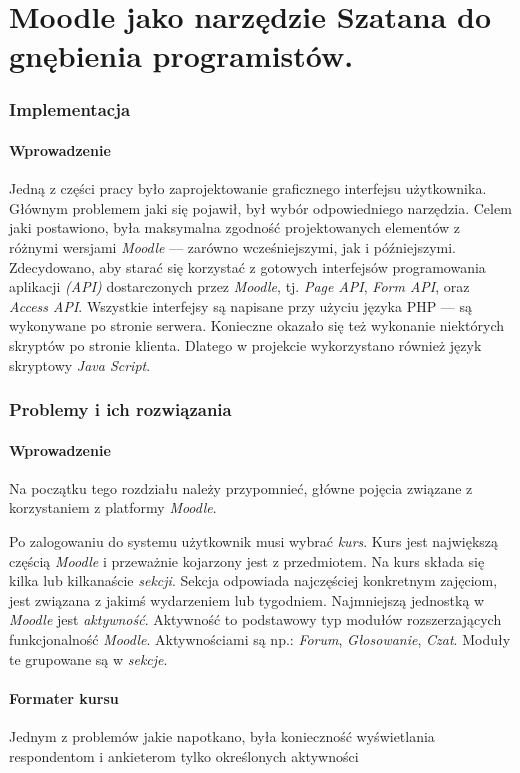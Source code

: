 \documentclass[12pt]{article}
\begin{document}
\part{Moodle jako narzędzie Szatana do gnębienia programistów.}

\section{Implementacja}
\subsection{Wprowadzenie}
Jedną z części pracy było zaprojektowanie graficznego interfejsu użytkownika. Głównym problemem jaki się pojawił, był wybór odpowiedniego narzędzia. Celem jaki postawiono, była maksymalna zgodność projektowanych elementów z różnymi wersjami \emph{Moodle} --- zarówno wcześniejszymi, jak i późniejszymi. Zdecydowano, aby starać się korzystać z gotowych interfejsów programowania aplikacji \emph{(API)} dostarczonych przez \emph{Moodle}, tj. \emph{Page API}, \emph{Form API}, oraz \emph{Access API}. Wszystkie interfejsy są napisane przy użyciu języka PHP --- są wykonywane po stronie serwera. Konieczne okazało się też wykonanie niektórych skryptów po stronie klienta. Dlatego w projekcie wykorzystano również język skryptowy \emph{Java Script}.

\section{Problemy i ich rozwiązania}
\subsection{Wprowadzenie}
Na początku tego rozdziału należy przypomnieć, główne pojęcia związane z korzystaniem z platformy \emph{Moodle}.

Po zalogowaniu do systemu użytkownik musi wybrać \emph{kurs}. Kurs jest największą częścią \emph{Moodle} i przeważnie kojarzony jest z przedmiotem. Na kurs składa się kilka lub kilkanaście \emph{sekcji}. Sekcja odpowiada najczęściej konkretnym zajęciom, jest związana z jakimś wydarzeniem lub tygodniem. Najmniejszą jednostką w \emph{Moodle} jest \emph{aktywność}. Aktywność to podstawowy typ modułów rozszerzających funkcjonalność \emph{Moodle}. Aktywnościami są np.: \emph{Forum}, \emph{Głosowanie}, \emph{Czat}. Moduły te grupowane są w \emph{sekcje}.
\subsection{Formater kursu}
Jednym z problemów jakie napotkano, była konieczność wyświetlania respondentom i ankieterom tylko określonych aktywności
\end{document}

